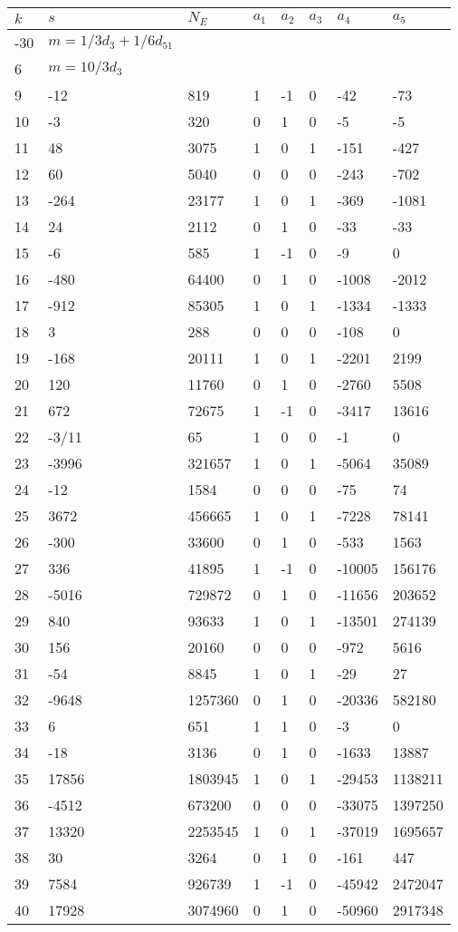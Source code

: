 \documentclass{amsart}
\begin{document}
\begin{longtable}{|l|l|l|lllll|}
\hline
$k$ & $s$ & $N_E$ & $a_1$ & $a_2$ & $a_3$ & $a_4$ & $a_5$\\
\hline
-30&$m=1/3d_{3}+1/6d_{51}$&&\multicolumn{5}{c|}{}\\
6&$m=10/3d_{3}$&&\multicolumn{5}{c|}{}\\
9&-12&819&1&-1&0&-42&-73\\
10&-3&320&0&1&0&-5&-5\\
11&48&3075&1&0&1&-151&-427\\
12&60&5040&0&0&0&-243&-702\\
13&-264&23177&1&0&1&-369&-1081\\
14&24&2112&0&1&0&-33&-33\\
15&-6&585&1&-1&0&-9&0\\
16&-480&64400&0&1&0&-1008&-2012\\
17&-912&85305&1&0&1&-1334&-1333\\
18&3&288&0&0&0&-108&0\\
19&-168&20111&1&0&1&-2201&2199\\
20&120&11760&0&1&0&-2760&5508\\
21&672&72675&1&-1&0&-3417&13616\\
22&-3/11&65&1&0&0&-1&0\\
23&-3996&321657&1&0&1&-5064&35089\\
24&-12&1584&0&0&0&-75&74\\
25&3672&456665&1&0&1&-7228&78141\\
26&-300&33600&0&1&0&-533&1563\\
27&336&41895&1&-1&0&-10005&156176\\
28&-5016&729872&0&1&0&-11656&203652\\
29&840&93633&1&0&1&-13501&274139\\
30&156&20160&0&0&0&-972&5616\\
31&-54&8845&1&0&1&-29&27\\
32&-9648&1257360&0&1&0&-20336&582180\\
33&6&651&1&1&0&-3&0\\
34&-18&3136&0&1&0&-1633&13887\\
35&17856&1803945&1&0&1&-29453&1138211\\
36&-4512&673200&0&0&0&-33075&1397250\\
37&13320&2253545&1&0&1&-37019&1695657\\
38&30&3264&0&1&0&-161&447\\
39&7584&926739&1&-1&0&-45942&2472047\\
40&17928&3074960&0&1&0&-50960&2917348\\

\end{longtable}
\end{document}
